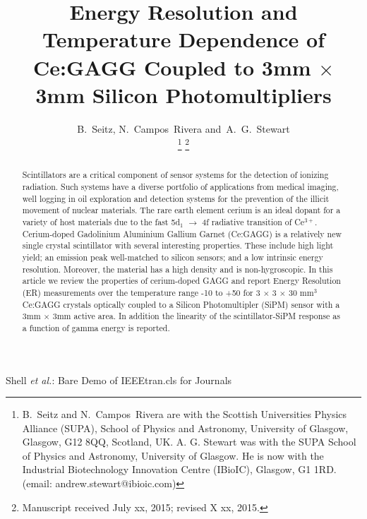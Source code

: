 \documentclass[journal]{IEEEtran}
\begin{document}
\title{Energy Resolution and Temperature Dependence of Ce:GAGG Coupled to 3mm $\times$ 3mm Silicon Photomultipliers}

\author{B.~Seitz, 
	N.~Campos~Rivera
	and~A.~G.~Stewart%

\thanks{B.~Seitz and N.~Campos~Rivera are with the Scottish Universities Physics Alliance (SUPA), School of Physics and Astronomy, University of Glasgow, Glasgow, G12 8QQ, Scotland, UK. A. G. Stewart was with the SUPA School of Physics and Astronomy, University of Glasgow. He is now with the Industrial Biotechnology Innovation Centre (IBioIC), Glasgow, G1 1RD. (email: andrew.stewart@ibioic.com)}%
\thanks{Manuscript received July xx, 2015; revised X xx, 2015.}}

%
{Shell \MakeLowercase{\textit{et al.}}: Bare Demo of IEEEtran.cls for Journals}

\maketitle

\begin{abstract}
Scintillators are a critical component of sensor systems for the detection of ionizing radiation. Such systems have a diverse portfolio of applications from medical imaging, well logging in oil exploration and detection systems for the prevention of the illicit movement of nuclear materials. The rare earth element cerium is an ideal dopant for a variety of host materials due to the fast 5d$_{1}$ $\rightarrow$ 4f radiative transition of Ce$^{3+}$. Cerium-doped Gadolinium Aluminium Gallium Garnet (Ce:GAGG) is a relatively new single crystal scintillator with several interesting properties. These include high light yield; an emission peak well-matched to silicon sensors; and a low intrinsic energy resolution. Moreover, the material has a high density and is non-hygroscopic. In this article we review the properties of cerium-doped GAGG and report Energy Resolution (ER) measurements over the temperature range -10\celsius{} to +50\celsius{} for 3 $\times$ 3 $\times$ 30 mm$^{3}$ Ce:GAGG crystals optically coupled to a Silicon Photomultipler (SiPM) sensor with a 3mm $\times$ 3mm active area. In addition the linearity of the scintillator-SiPM response as a function of gamma energy is reported. 
\end{abstract}
\end{document}
